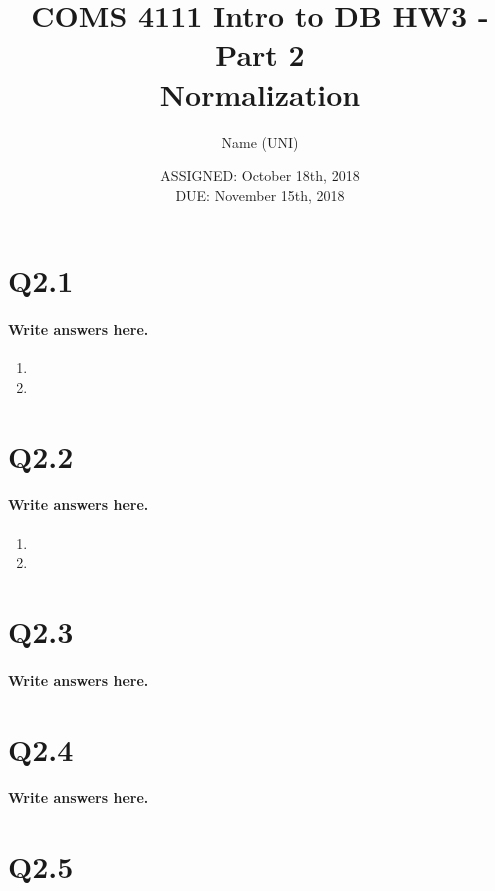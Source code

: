\documentclass{article}
\title{COMS 4111 Intro to DB HW3 - Part 2 \\
Normalization}
\author{Name (UNI)}
\date{ASSIGNED: October 18th, 2018 \\
DUE: November 15th, 2018}
\begin{document}
\maketitle



\pagebreak

\section*{Q2.1}
\paragraph{Write answers here.}
\begin{enumerate}[label=\alph*]
    \item
    \item
\end{enumerate}

\newpage

\section*{Q2.2}
\paragraph{Write answers here.}
\begin{enumerate}[label=\alph*]
    \item
    \item
\end{enumerate}

\newpage

\section*{Q2.3}
\paragraph{Write answers here.}

\section*{Q2.4}
\paragraph{Write answers here.}


\section*{Q2.5}
\end{document}
